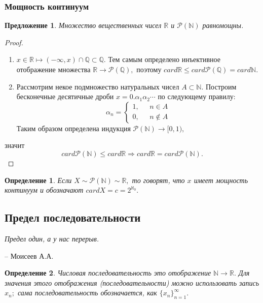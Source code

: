 \documentclass{article}
\newtheorem{Proposition}{Предложение}[section]
\newtheorem{Definition}{Определение}[section]
\begin{document}
\subsubsection{Мощность континуум}
\begin{Proposition}
Множество вещественных чисел $\mathbb{R}$ и $\mathcal{P}(\mathbb{N})$ равномощны.
\end{Proposition}
\begin{proof}
\begin{enumerate}
\item $x\in\mathbb{R} \longmapsto (-\infty, x)\cap\mathbb{Q} \subset \mathbb{Q}.$ Тем самым определено инъективное отображение множества $\mathbb{R} \rightarrow\mathcal{P}(\mathbb{Q}),$ поэтому $card\mathbb{R}\leq card\mathcal{P}(\mathbb{Q})=card\mathbb{N}.$
\item Рассмотрим некое подмножество натуральных чисел $A\subset\mathbb{N}.$ Построим бесконечные десятичные дроби $x=0.\alpha_1\alpha_2\cdots$ по следующему правилу:
\begin{equation*}
\alpha_n = 
 \begin{cases}
   1, &\text{ $n\in A $}\\
   0, &\text{ $n\notin A$}
 \end{cases}
\end{equation*}
Таким образом определена индукция $\mathcal{P}(\mathbb{N}) \rightarrow [0, 1),$ 
\end{enumerate} 
значит $$card\mathcal{P}(\mathbb{N})\leq card\mathbb{R} \Rightarrow card\mathbb{R}= card\mathcal{P}(\mathbb{N}).$$
\end{proof}

\begin{Definition}
Если $X\sim\mathcal{P}(\mathbb{N})\sim\mathbb{R},$ то говорят, что $x$ имеет мощность континуум и обозначают $cardX=c=2^{\aleph_0}.$
\end{Definition}

\newpage

\begin{center}
\section{\LARGE{\bf Предел последовательности}}
\end{center}
\epigraph{\textit{Предел один, а у нас перерыв.}}
{-- Моисеев А.А.}


\begin{Definition}
Числовая последовательность это отображение $\mathbb{N} \rightarrow \mathbb{R}.$ Для значения этого отображения (последовательности) можно использовать запись $x_n;$ сама последовательность обозначается, как $\{x_n\}_{n=1}^{\infty}.$
\end{Definition} 
\end{document}
